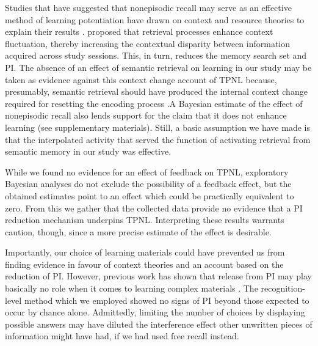 \documentclass[../main.tex]{subfiles}
\begin{document}
Studies that have suggested that nonepisodic recall may serve as an effective
method of learning potentiation have drawn on context and resource theories 
to explain their results \citep{divisRetrievalSpeedsContext2014, 
pastotterRetrievalLearningFacilitates2011}. 
\cite{divisRetrievalSpeedsContext2014} proposed that retrieval processes 
enhance context fluctuation, thereby increasing the contextual disparity 
between information acquired across study sessions. This, in turn, reduces 
the memory search set and PI. The absence of an effect of semantic retrieval 
on learning in our study may be taken as evidence against this context 
change account of TPNL because, presumably, semantic retrieval should have 
produced the internal context change required for resetting the encoding 
process \citep{pastotterRetrievalLearningFacilitates2011}.A Bayesian 
estimate of the effect of nonepisodic recall also lends support for the 
claim that it does not enhance learning (see supplementary materials). 
Still, a basic assumption we have made is that the interpolated activity 
that served the function of activating retrieval from semantic memory in our 
study was effective. 

While we found no evidence for an effect of feedback on TPNL, exploratory 
Bayesian analyses do not exclude the possibility of a feedback effect, but 
the obtained estimates point to an effect which could be practically 
equivalent to zero. From this we gather that the collected data provide no 
evidence that a PI reduction mechanism underpins TPNL. Interpreting these 
results warrants caution, though, since a more precise estimate of the 
effect is desirable.

Importantly, our choice of learning materials could have prevented us from 
finding evidence in favour of context theories and an account based on the 
reduction of PI. However, previous work has shown that release from PI may 
play basically no role when it comes to learning complex materials 
\cite{wissmanInterimTestEffect2011}. The recognition-level method which we 
employed showed no signs of PI beyond those expected to occur by chance 
alone. Admittedly, limiting the number of choices by displaying possible 
answers may have diluted the interference effect other unwritten pieces of 
information might have had, if we had used free recall instead.
\end{document}
